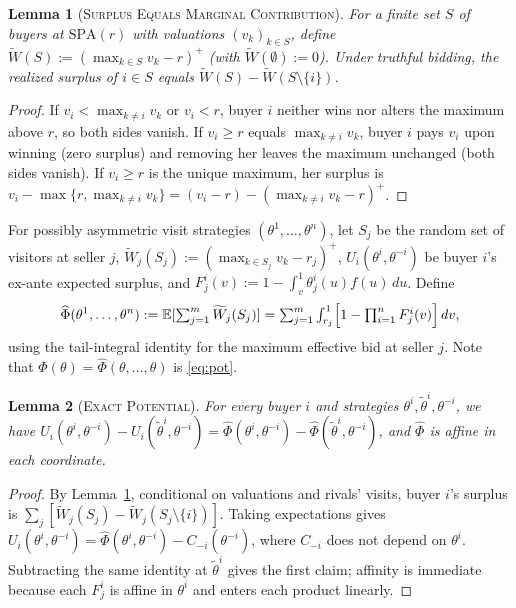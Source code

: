 \documentclass[12pt]{article}
\theoremstyle{mystyle}
\newtheorem{lemma}{Lemma}
\theoremstyle{mystyle2}
\newcommand{\EV}[1]{\mathbb{E}[#1]}
\newcommand{\SPA}{\mathrm{SPA}}
\newcommand{\1}{\mathbf{1}}
\begin{document}
\begin{lemma}[\textsc{Surplus Equals Marginal Contribution}]\label{lem:vcg}
For a finite set $S$ of buyers at $\SPA(r)$ with valuations $(v_k)_{k\in S}$, define $\widetilde W(S):=(\max_{k\in S}v_k-r)^+$ (with $\widetilde W(\emptyset):=0$). Under truthful bidding, the realized surplus of $i\in S$ equals $\widetilde W(S)-\widetilde W(S\setminus\{i\})$.
\end{lemma}
\begin{proof}
If $v_i<\max_{k\ne i}v_k$ or $v_i<r$, buyer $i$ neither wins nor alters the maximum above $r$, so both sides vanish. If $v_i\ge r$ equals $\max_{k\ne i}v_k$, buyer $i$ pays $v_i$ upon winning (zero surplus) and removing her leaves the maximum unchanged (both sides vanish). If $v_i\ge r$ is the unique maximum, her surplus is $v_i-\max\{r,\max_{k\ne i}v_k\}=(v_i-r)-(\max_{k\ne i}v_k-r)^+$.
\end{proof}

For possibly asymmetric visit strategies $(\theta^1,\dots,\theta^n)$, let $S_j$ be the random set of visitors at seller $j$, $\widetilde W_j(S_j):=(\max_{k\in S_j}v_k-r_j)^+$, $U_i(\theta^i,\theta^{-i})$ be buyer $i$'s ex-ante expected surplus, and $F_j^i(v):=1-\int_v^1\theta_j^i(u)f(u)\,du$. Define
\[
\widehat\Phi(\theta^1,\dots,\theta^n) := \EV{\textstyle\sum_{j=1}^m \widetilde W_j(S_j)} = \sum_{j=1}^m \int_{r_j}^1 \Bigl[1 - \prod_{i=1}^n F_j^i(v)\Bigr]\,dv,
\]
using the tail-integral identity for the maximum effective bid at seller $j$. Note that $\Phi(\theta)=\widehat\Phi(\theta,\dots,\theta)$ is \eqref{eq:pot}.

\begin{lemma}[\textsc{Exact Potential}]\label{lem:potential}
For every buyer $i$ and strategies $\theta^i,\tilde\theta^i,\theta^{-i}$, we have $U_i(\theta^i,\theta^{-i})-U_i(\tilde\theta^i,\theta^{-i})=\widehat\Phi(\theta^i,\theta^{-i})-\widehat\Phi(\tilde\theta^i,\theta^{-i})$, and $\widehat\Phi$ is affine in each coordinate.
\end{lemma}
\begin{proof}
By Lemma~\ref{lem:vcg}, conditional on valuations and rivals' visits, buyer $i$'s surplus is $\sum_j[\widetilde W_j(S_j)-\widetilde W_j(S_j\setminus\{i\})]$. Taking expectations gives $U_i(\theta^i,\theta^{-i})=\widehat\Phi(\theta^i,\theta^{-i})-C_{-i}(\theta^{-i})$, where $C_{-i}$ does not depend on $\theta^i$. Subtracting the same identity at $\tilde\theta^i$ gives the first claim; affinity is immediate because each $F_j^i$ is affine in $\theta^i$ and enters each product linearly.
\end{proof}
\end{document}
